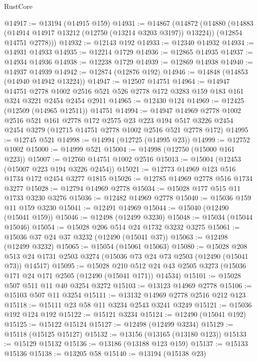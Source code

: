 \begin{lexlean}{RustCore}
\begin{coremodule}
@14917 := @13194 (@14915 @159)
@14931 := @14867
    (@14872
      (@14880
        (@14883 (@14914 @14917 @13212 (@12750 (@13214 @3203 @3197)) @13224))
        (@12854 @14751 @2778)))
@14932 := @12143 @192
@14933 := @12340 @14932
@14934 := @14931 @14933
@14935 := @12214 @1729
@14936 := @12865 @14935
@14937 := @14934 @14936
@14938 := @12238 @1729
@14939 := @12869 @14938
@14940 := @14937 @14939
@14942 := @12874 (@12876 @192)
@14946 := @14848 (@14853 (@14940 @14942 @13224))
@14947 := @12507 @14751
@14964 := @14947
    @14751
    @2778
    @1002
    @2516
    @521
    @526
    @2778
    @172
    @3283
    @159
    @183
    @161
    @324
    @3221
    @2454
    @2454
    @2911
@14965 := @12430 @124
@14969 := @12425 (@12509 (@14965 @12511)) @14751
@14994 := @14947
    @14969
    @2778
    @1002
    @2516
    @521
    @161
    @2778
    @172
    @2575
    @23
    @223
    @194
    @517
    @3226
    @2454
    @2454
    @3279
    (@12715 @14751 @2778 @1002 @2516 @521 @2778 @172)
@14995 := @12745 @521
@14998 := @14994 (@12725 (@14995 @23))
@14999 := @12752 @1002
@15000 := @14999 @521
@15004 := @14998 (@12750 (@15000 @161 @223))
@15007 := @12760 @14751 @1002 @2516
@15013 := @15004 (@12453 (@15007 @223 @194 @3226 @2454))
@15021 := @12773 @14969 @123 @516 @1734 @172 @2454 @3277 @1815
@15026 := @12785 @14969 @2778 @516 @1734 @3277
@15028 := @12794 @14969 @2778
@15034 := @15028 @177 @515 @11 @1733 @3230 @3276
@15036 := @12482 @14969 @2778
@15040 := @15036 @159 @11 @159 @3230
@15041 := @12491 @14969
@15044 := @15040 (@12490 (@15041 @159))
@15046 := @12498 (@12499 @3230)
@15048 := @15034 (@15044 @15046)
@15054 := @15028 @206 @514 @24 @1732 @3232 @3275
@15061 := @15036 @37 @24 @37 @3232 (@12490 (@15041 @37))
@15063 := @12498 (@12499 @3232)
@15065 := @15054 (@15061 @15063)
@15080 := @15028
    @208
    @513
    @24
    @1731
    @2503
    @3274
    (@15036 @73 @24 @73 @2503 (@12490 (@15041 @73)) @14517)
@15095 := @15028
    @210
    @512
    @24
    @43
    @2505
    @3273
    (@15036 @171 @24 @171 @2505 (@12490 (@15041 @171)) @14534)
@15101 := @15028 @507 @511 @11 @40 @3254 @3272
@15103 := @13123 @14969 @2778
@15106 := @15103 @507 @11 @3254
@15111 := @13132 @14969 @2778 @2516 @212 @123
@15118 := @15111 @23 @58 @11 @3234 @2543 @3241 @3249
@15121 := @15036 @192 @124 @192
@15122 := @15121 @3234
@15124 := @12490 (@15041 @192)
@15125 := @15122 @15124
@15127 := @12498 (@12499 @3234)
@15129 := @15118 (@15125 @15127)
@15132 := @13156 (@13165 (@13180 @123))
@15133 := @15129 @15132
@15136 := @13186 (@13188 @123 @159)
@15137 := @15133 @15136
@15138 := @13205 @58
@15140 := @13194 (@15138 @23)

\end{coremodule}
\end{lexlean}
